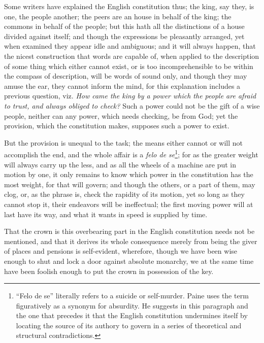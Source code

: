 \documentclass[12pt, twocolumn]{book}
\begin{document}
    Some writers have explained the English constitution thus; the king, say they, is one, the people another; the peers are an house in behalf of the king; the commons in behalf of the people; but this hath all the distinctions of a house divided against itself; and though the expressions be pleasantly arranged, yet when examined they appear idle and ambiguous; and it will always happen, that the nicest construction that words are capable of, when applied to the description of some thing which either cannot exist, or is too incomprehensible to be within the compass of description, will be words of sound only, and though they may amuse the ear, they cannot inform the mind, for this explanation includes a previous question, viz. \textit{How came the king by a power which the people are afraid to trust, and always obliged to check?} Such a power could not be the gift of a wise people, neither can any power, which needs checking, be from God; yet the provision, which the constitution makes, supposes such a power to exist.

    But the provision is unequal to the task; the means either cannot or will not accomplish the end, and the whole affair is a \textit{felo de se}\footnote{``Felo de se'' literally refers to a suicide or self-murder. Paine uses the term figuratively as a synonym for absurdity. He suggests in this paragraph and the one that precedes it that the English constitution undermines itself by locating the source of its authory to govern in a series of theoretical and structural contradictions.}; for as the greater weight will always carry up the less, and as all the wheels of a machine are put in motion by one, it only remains to know which power in the constitution has the most weight, for that will govern; and though the others, or a part of them, may clog, or, as the phrase is, check the rapidity of its motion, yet so long as they cannot stop it, their endeavors will be ineffectual; the first moving power will at last have its way, and what it wants in speed is supplied by time.

    That the crown is this overbearing part in the English constitution needs not be mentioned, and that it derives its whole consequence merely from being the giver of places and pensions is self-evident, wherefore, though we have been wise enough to shut and lock a door against absolute monarchy, we at the same time have been foolish enough to put the crown in possession of the key.
\end{document}
